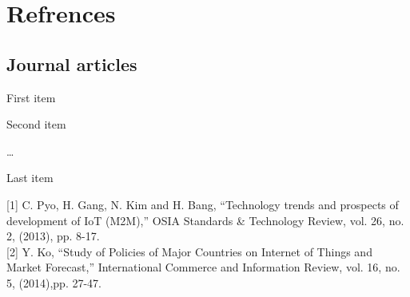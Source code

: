 \documentclass[twoside,a4paper,16pt]{book}
\begin{document}
{{\begin{figure}
		
		\end{figure}
			
			\chapter{Refrences}
			
			\section{Journal articles}
			\begin{enumerate}[label={[\arabic*]}]
			\item First item
			\item Second item
			\item \ldots
			\item Last item
		\end{enumerate}
			
			[1] 	C. Pyo, H. Gang, N. Kim and H. Bang, “Technology trends and prospects 
			of development of IoT (M2M),” OSIA Standards \& Technology Review, vol. 26, no. 2, (2013), pp. 8-17.\\
			
			{[2]}	Y. Ko, “Study of Policies of Major Countries on Internet of Things and Market Forecast,” International Commerce and Information Review, vol. 16, no. 5, (2014),pp. 27-47.\\
			
}}
\end{document}
